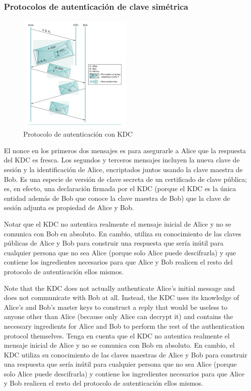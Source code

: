 \subsubsection*{Protocolos de autenticación de clave simétrica}
\begin{figure}[H]
	\centering
	\includegraphics[width=0.5\textwidth]{images/kcd-autenthication.png}
	\caption[Protocolo de autenticación con KDC]{Protocolo de autenticación con KDC}
	\label{fig:kcd-authentication}
\end{figure}
El nonce en los primeros dos mensajes es para asegurarle a Alice que la respuesta del KDC es fresca. Los segundos y terceros mensajes incluyen la nueva clave de sesión y la identificación de Alice, encriptados juntos usando la clave maestra de Bob. Es una especie de versión de clave secreta de un certificado de clave pública; es, en efecto, una declaración firmada por el KDC (porque el KDC es la única entidad además de Bob que conoce la clave maestra de Bob) que la clave de sesión adjunta es propiedad de Alice y Bob.

Notar que el KDC no autentica realmente el mensaje inicial de Alice y no se comunica con Bob en absoluto. En cambio, utiliza su conocimiento de las claves públicas de Alice y Bob para construir una respuesta que sería inútil para cualquier persona que no sea Alice (porque solo Alice puede descifrarla) y que contiene los ingredientes necesarios para que Alice y Bob realicen el resto del protocolo de autenticación ellos mismos.

\newpage
Note that the KDC does not actually authenticate Alice’s initial 
message and does not communicate with Bob at all. Instead, the KDC 
uses its knowledge of Alice’s and Bob’s master keys to construct a reply 
that would be useless to anyone other than Alice (because only Alice can 
decrypt it) and contains the necessary ingredients for Alice and Bob to 
perform the rest of the authentication protocol themselves.
Tenga en cuenta que el KDC no autentica realmente el mensaje inicial de Alice y no se comunica con Bob en absoluto. En cambio, el KDC utiliza su conocimiento de las claves maestras de Alice y Bob para construir una respuesta que sería inútil para cualquier persona que no sea Alice (porque solo Alice puede descifrarla) y contiene los ingredientes necesarios para que Alice y Bob realicen el resto del protocolo de autenticación ellos mismos.

